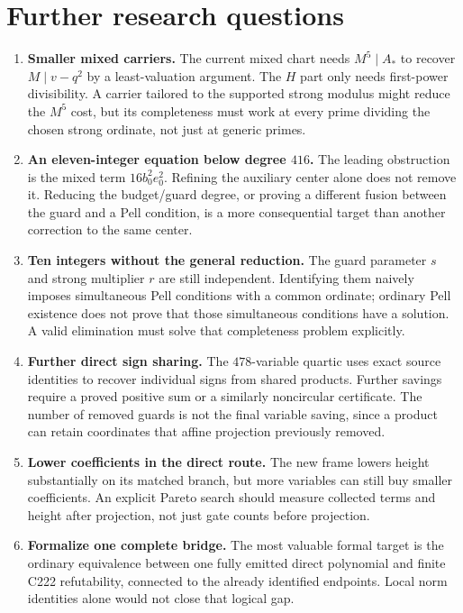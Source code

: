 \documentclass[11pt]{article}
\theoremstyle{definition}
\theoremstyle{remark}
\begin{document}
\section{Further research questions}
\label{sec:further}

\begin{enumerate}
\item \textbf{Smaller mixed carriers.} The current mixed chart needs
      $M^5\mid A_*$ to recover $M\mid v-q^2$ by a least-valuation
      argument. The $H$ part only needs first-power divisibility.
      A carrier tailored to the supported strong modulus might reduce
      the $M^5$ cost, but its completeness must work at every prime
      dividing the chosen strong ordinate, not just at generic primes.
\item \textbf{An eleven-integer equation below degree $416$.}
      The leading obstruction is the mixed term $16b_0^2e_0^2$.
      Refining the auxiliary center alone does not remove it.
      Reducing the budget/guard degree, or proving a different fusion
      between the guard and a Pell condition, is a more consequential
      target than another correction to the same center.
\item \textbf{Ten integers without the general reduction.}
      The guard parameter $s$ and strong multiplier $r$ are still
      independent. Identifying them naively imposes simultaneous Pell
      conditions with a common ordinate; ordinary Pell existence
      does not prove that those simultaneous conditions have a
      solution. A valid elimination must solve that completeness
      problem explicitly.
\item \textbf{Further direct sign sharing.}
      The $478$-variable quartic uses exact source identities to
      recover individual signs from shared products. Further savings
      require a proved positive sum or a similarly noncircular
      certificate. The number of removed guards is not the final
      variable saving, since a product can retain coordinates that
      affine projection previously removed.
\item \textbf{Lower coefficients in the direct route.}
      The new frame lowers height substantially on its matched
      branch, but more variables can still buy smaller coefficients.
      An explicit Pareto search should measure collected terms and
      height after projection, not just gate counts before projection.
\item \textbf{Formalize one complete bridge.}
      The most valuable formal target is the ordinary equivalence
      between one fully emitted direct polynomial and finite C222
      refutability, connected to the already identified endpoints.
      Local norm identities alone would not close that logical gap.
\end{enumerate}
\end{document}
